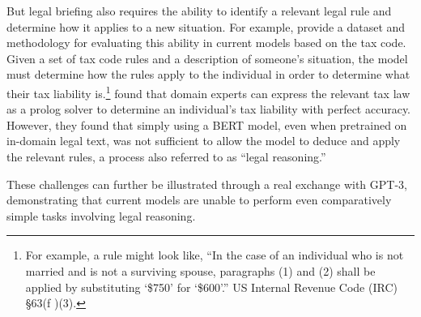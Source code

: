 But legal briefing also requires the ability to identify a relevant legal rule and determine how it applies to a new situation.
For example, \citet{holzenberger2020dataset} provide a dataset and methodology for evaluating this ability in current models based on the tax code. 
Given a set of tax code rules and a description of someone's situation, the model must determine how the rules apply to the individual in order to determine what their tax liability is.\footnote{For example, a rule might look like, ``In the case of an individual who is not married and is
not a surviving spouse, paragraphs (1) and (2) shall be
applied by substituting `\$750' for `\$600'.'' US Internal Revenue Code (IRC) \S 63(f )(3).}
\citet{holzenberger2020dataset} found that domain experts can express the relevant tax law as a prolog solver to determine an individual's tax liability with perfect accuracy. However, they found that simply using a BERT model, even when pretrained on in-domain legal text, was not sufficient to allow the model to deduce and apply the relevant rules, a process also referred to as ``legal reasoning.'' 

These challenges can further be illustrated through a real exchange with GPT-3, demonstrating that current models are unable to perform even comparatively simple tasks involving legal reasoning.

